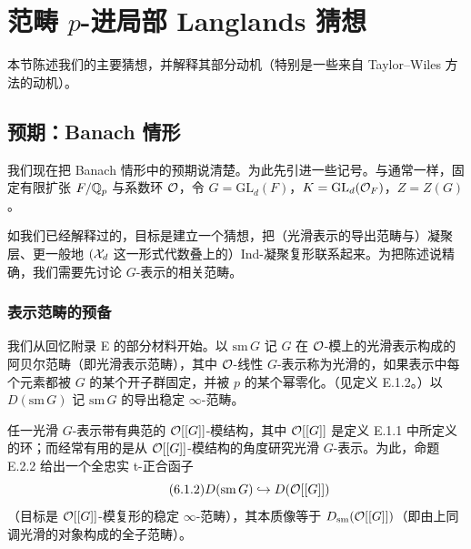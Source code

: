 \section{范畴 $p$-进局部 Langlands 猜想}
本节陈述我们的主要猜想，并解释其部分动机（特别是一些来自 Taylor--Wiles 方法的动机）。

\subsection{预期：Banach 情形}
我们现在把 Banach 情形中的预期说清楚。为此先引进一些记号。与通常一样，固定有限扩张 $F/\mathbb{Q}_p$ 与系数环 $\mathcal{O}$，令 $G=\mathrm{GL}_d(F)$，$K=\mathrm{GL}_d(\mathcal{O}_F)$，$Z=Z(G)$。

如我们已经解释过的，目标是建立一个猜想，把（光滑表示的导出范畴与）凝聚层、更一般地 $(\mathcal{X}_d$ 这一形式代数叠上的）Ind-凝聚复形联系起来。为把陈述说精确，我们需要先讨论 $G$-表示的相关范畴。

\subsubsection{表示范畴的预备}
我们从回忆附录 E 的部分材料开始。以 $\mathrm{sm}\,G$ 记 $G$ 在 $\mathcal{O}$-模上的光滑表示构成的阿贝尔范畴（即光滑表示范畴），其中 $\mathcal{O}$-线性 $G$-表示称为光滑的，如果表示中每个元素都被 $G$ 的某个开子群固定，并被 $p$ 的某个幂零化。（见定义 E.1.2。）以 $D(\mathrm{sm}\,G)$ 记 $\mathrm{sm}\,G$ 的导出稳定 $\infty$-范畴。

任一光滑 $G$-表示带有典范的 $\mathcal{O}[[G]]$-模结构，其中 $\mathcal{O}[[G]]$ 是定义 E.1.1 中所定义的环；而经常有用的是从 $\mathcal{O}[[G]]$-模结构的角度研究光滑 $G$-表示。为此，命题 E.2.2 给出一个全忠实 t-正合函子
\begin{equation}\tag{6.1.2}\label{eq:a4-6-1-2}
D(\mathrm{sm}\,G)\hookrightarrow D(\mathcal{O}[[G]])
\end{equation}
（目标是 $\mathcal{O}[[G]]$-模复形的稳定 $\infty$-范畴），其本质像等于 $D_{\mathrm{sm}}(\mathcal{O}[[G]])$（即由上同调光滑的对象构成的全子范畴）。

